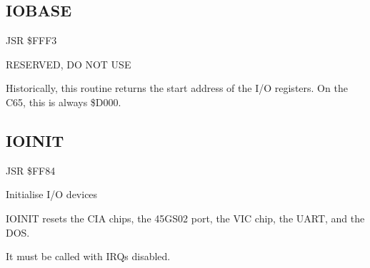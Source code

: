
\newpage
\subsection{IOBASE}
\label{KERNAL Jump Table!IOBASE}
\begin{description}[leftmargin=2cm,style=nextline]
    \item [Address:] JSR \$FFF3
    \item [Description:] RESERVED, DO NOT USE
    \item [Remarks:]
        Historically, this routine returns the start address of the I/O registers. On the C65, this is always \$D000.
\end{description}



\newpage
\subsection{IOINIT}
\label{KERNAL Jump Table!IOINIT}
\begin{description}[leftmargin=2cm,style=nextline]
    \item [Address:] JSR \$FF84
    \item [Description:] Initialise I/O devices
    \item [Remarks:]
        IOINIT resets the CIA chips, the 45GS02 port, the VIC chip, the UART, and the DOS.

        It must be called with IRQs disabled.
    \item [Example:]
\end{description}



\newpage
